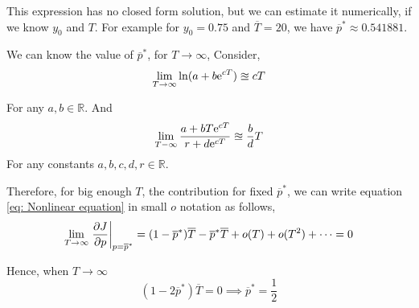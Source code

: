 This expression has no closed form solution, but we can estimate it numerically, if we know $y_0$ and $T$. For example for $y_0=0.75$ and $\overline{T}=20$, we have
$\overline{p}^* \approx 0.541881$.


We can know the value of $\overline{p}^*$, for $T\rightarrow\infty$, Consider,  
\begin{equation}	
\lim\limits_{T\rightarrow \infty} \ln(a+b\mathrm{e}^{cT})\approxeq cT
\end{equation}

For any $a,b \in \mathbb{R}$. And
\begin{equation}
	\lim\limits_{T-\infty}\frac{a+bT\mathrm{e}^{cT}}{r+d\mathrm{e}^{cT}} \approxeq \frac{b}{d}T
\end{equation}
For any constants $a,b,c,d,r \in \mathbb{R}$. 

Therefore, for big enough $T$, the contribution for fixed $\overline{p}^*$, we can write equation \ref{eq: Nonlinear equation} in small $o$ notation as follows,
\begin{equation}
\lim\limits_{T\rightarrow \infty}\left.\frac{\partial J}{{\partial p}}\right|_{p=\overline{p}^*} =(1-\overline{p}^*)\overline{T}-\overline{p}^*\overline{T}+o(T)+o(T^2)+\dots=0 
\end{equation}

Hence, when $T\rightarrow \infty$
\begin{equation}
	(1-2\overline{p}^*)\overline{T}=0\implies \overline{p}^*=\frac{1}{2}
\end{equation}
